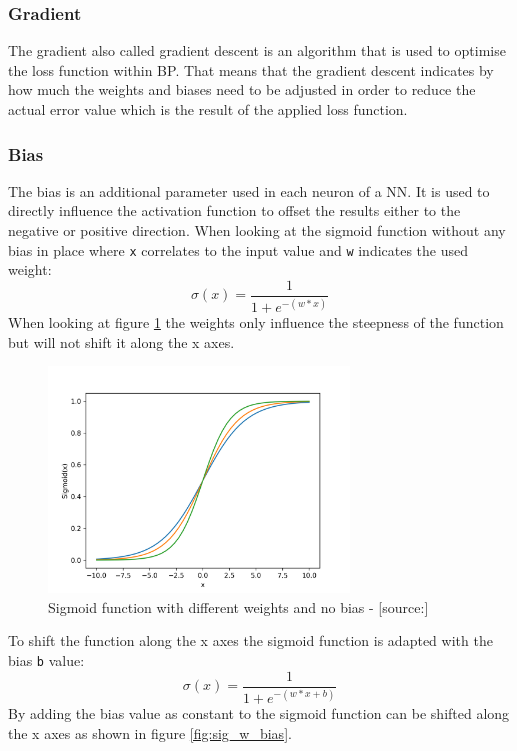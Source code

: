 \subsubsection{Gradient}
The gradient also called gradient descent is an algorithm that is used to optimise the loss function within BP. That means that the gradient descent indicates by how much the weights and biases need to be adjusted in order to reduce the actual error value which is the result of the applied loss function. \cite{bp_basic}
\subsubsection{Bias}
The bias is an additional parameter used in each neuron of a NN. It is used to directly influence the activation function to offset the results either to the negative or positive direction. When looking at the sigmoid function without any bias in place where \verb|x| correlates to the input value and \verb|w| indicates the used weight: 
\begin{equation}
 \sigma(x) = \frac{1} {1 + e^{-{(w*x)}}}
\label{eq:eq_4}
\end{equation}
When looking at figure \ref{fig:sig_wo_bias} the weights only influence the steepness of the function but will not shift it along the x axes.
\begin{figure}[H]
	\centering
		\includegraphics[width=8cm]{images/sigmoid_w_weights}
	\caption{Sigmoid function with different weights and no bias - [source:\cite{lstm_module}]}
	\label{fig:sig_wo_bias}
\end{figure}
 To shift the function along the x axes the sigmoid function is adapted with the bias \verb|b| value: 
\begin{equation}
 \sigma(x) = \frac{1} {1 + e^{-{(w*x+b)}}}
\label{eq:eq_4}
\end{equation}
By adding the bias value as constant to the sigmoid function can be shifted along the x axes as shown in figure \ref{fig:sig_w_bias}.
